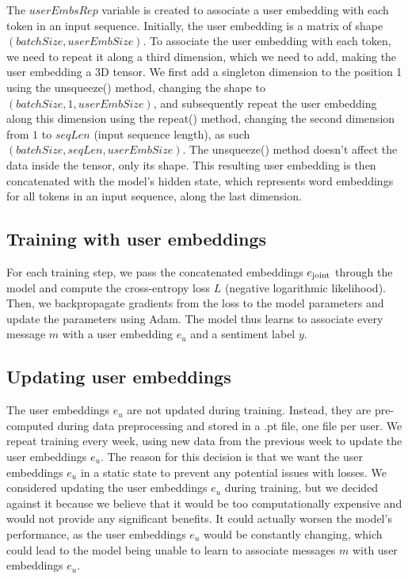 \documentclass{article}
\begin{document}
The $userEmbsRep$ variable is created to associate a user embedding with each token in an input sequence. Initially, the user embedding is a matrix of shape $(batchSize, userEmbSize)$. To associate the user embedding with each token, we need to repeat it along a third dimension, which we need to add, making the user embedding a 3D tensor. We first add a singleton dimension to the position 1 using the unsqueeze() method, changing the shape to $(batchSize, 1, userEmbSize)$, and subsequently repeat the user embedding along this dimension using the repeat() method, changing the second dimension from $1$ to $seqLen$ (input sequence length), as such $(batchSize, seqLen, userEmbSize)$. The unsqueeze() method doesn't affect the data inside the tensor, only its shape. This resulting user embedding is then concatenated with the model's hidden state, which represents word embeddings for all tokens in an input sequence, along the last dimension.

\subsection{Training with user embeddings}
For each training step, we pass the concatenated embeddings $e_\textnormal{joint}$ through the model and compute the cross-entropy loss $L$ (negative logarithmic likelihood). Then, we backpropagate gradients from the loss to the model parameters and update the parameters using Adam. The model thus learns to associate every message $m$ with a user embedding $e_u$ and a sentiment label $y$.

\subsection{Updating user embeddings}
The user embeddings $e_u$ are not updated during training. Instead, they are pre-computed during data preprocessing and stored in a .pt file, one file per user. We repeat training every week, using new data from the previous week to update the user embeddings $e_u$. The reason for this decision is that we want the user embeddings $e_u$ in a static state to prevent any potential issues with losses. We considered updating the user embeddings $e_u$ during training, but we decided against it because we believe that it would be too computationally expensive and would not provide any significant benefits. It could actually worsen the model's performance, as the user embeddings $e_u$ would be constantly changing, which could lead to the model being unable to learn to associate messages $m$ with user embeddings $e_u$.
\end{document}

